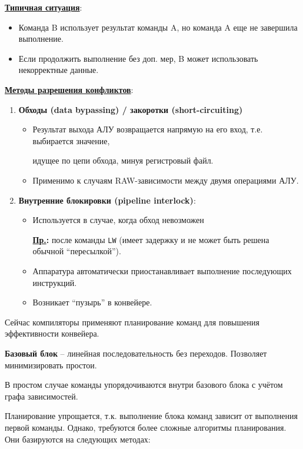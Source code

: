 	\textbf{\uline{Типичная ситуация}}:

	\begin{itemize}
		\item Команда B использует результат команды A, но команда A еще не завершила выполнение.
		\item Если продолжить выполнение без доп. мер, B может использовать некорректные данные.
	\end{itemize}
	
	\textbf{\uline{Методы разрешения конфликтов}}:
	
	\begin{enumerate}
		\item \textbf{Обходы (data bypassing) / закоротки (short-circuiting)}
			\begin{itemize}
				\item Результат выхода АЛУ возвращается напрямую на его вход, т.е. выбирается значение, 
				\par
				идущее по цепи обхода, минуя регистровый файл.
				\item Применимо к случаям RAW-зависимости между двумя операциями АЛУ.
			\end{itemize}
		\item \textbf{Внутренние блокировки (pipeline interlock)}:
		\begin{itemize}
			\item Используется в случае, когда обход невозможен
			\par
			\textbf{\uline{Пр.}:} после команды \texttt{LW} (имеет задержку и не может быть решена обычной ``пересылкой'').
			\item Аппаратура автоматически приостанавливает выполнение последующих инструкций.
			\item Возникает ``пузырь'' в конвейере.
		\end{itemize}
	\end{enumerate}
	Сейчас компиляторы применяют планирование команд для повышения эффективности конвейера.
	\par
	\textbf{Базовый блок} -- линейная последовательность без переходов. Позволяет минимизировать простои. 
	\par
	В простом случае команды упорядочиваются внутри базового блока с учётом графа зависимостей.
	\par
	Планирование упрощается, т.к. выполнение блока команд зависит от выполнения первой команды.
	\newpage
	Однако, требуются более сложные алгоритмы планирования. Они базируются на следующих методах:

